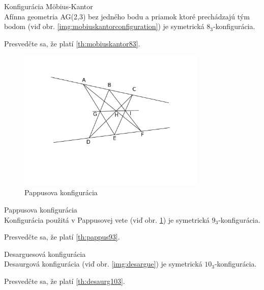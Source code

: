 \begin{theorem}{Konfigurácia Möbius-Kantor}\\
	\label{th:mobiuskantor83}
	Afínna geometria AG(2,3) bez jedného bodu a priamok ktoré prechádzajú tým bodom (viď obr. \ref{img:mobiuskantorconfiguration}) je symetrická $8_3$-konfigurácia. 
\end{theorem}

\begin{exercise}
	Presvedčte sa, že platí \ref{th:mobiuskantor83}.
\end{exercise}

\begin{figure}
	\centering
	\includegraphics[width=0.8\textwidth]{pappus_configuration}
	\caption{Pappusova konfigurácia}
	\label{img:pappus}
\end{figure}

\begin{theorem}{Pappusova konfigurácia}\\
	\label{th:pappus93}
	Konfigurácia použitá v Pappusovej vete (viď obr. \ref{img:pappus}) je symetrická $9_3$-konfigurácia. 
\end{theorem}

\begin{exercise}
	Presvedčte sa, že platí \ref{th:pappus93}.
\end{exercise}

\begin{theorem}{Desarguesová konfigurácia}\\
	\label{th:desaurg103}
	Desaurgová konfigurácia (viď obr. \ref{img:desargue}) je symetrická $10_3$-konfigurácia. 
\end{theorem}

\begin{exercise}
	Presvedčte sa, že platí \ref{th:desaurg103}.
\end{exercise}

